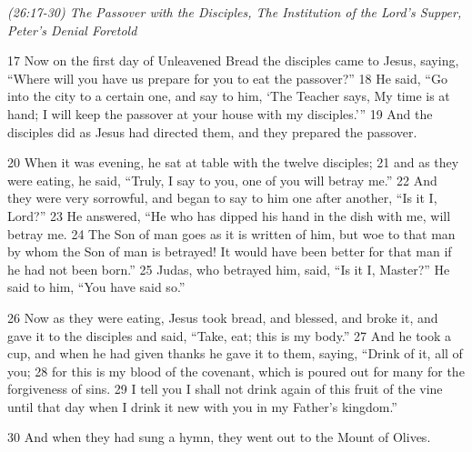 \documentclass[letterpaper]{report}
\begin{document}
{\centering
	\emph{(26:17-30) The Passover with the Disciples,
		The Institution of the Lord’s Supper,
		Peter’s Denial Foretold}\\
}
\begin{multicols}{2}
17 Now on the first day of Unleavened Bread the disciples came to Jesus, saying, “Where will you have us prepare for you to eat the passover?” 18 He said, “Go into the city to a certain one, and say to him, ‘The Teacher says, My time is at hand; I will keep the passover at your house with my disciples.’” 19 And the disciples did as Jesus had directed them, and they prepared the passover.

20 When it was evening, he sat at table with the twelve disciples; 21 and as they were eating, he said, “Truly, I say to you, one of you will betray me.” 22 And they were very sorrowful, and began to say to him one after another, “Is it I, Lord?” 23 He answered, “He who has dipped his hand in the dish with me, will betray me. 24 The Son of man goes as it is written of him, but woe to that man by whom the Son of man is betrayed! It would have been better for that man if he had not been born.” 25 Judas, who betrayed him, said, “Is it I, Master?” He said to him, “You have said so.”

26 Now as they were eating, Jesus took bread, and blessed, and broke it, and gave it to the disciples and said, “Take, eat; this is my body.” 27 And he took a cup, and when he had given thanks he gave it to them, saying, “Drink of it, all of you; 28 for this is my blood of the covenant, which is poured out for many for the forgiveness of sins. 29 I tell you I shall not drink again of this fruit of the vine until that day when I drink it new with you in my Father’s kingdom.”

30 And when they had sung a hymn, they went out to the Mount of Olives.
\end{multicols}
\end{document}
